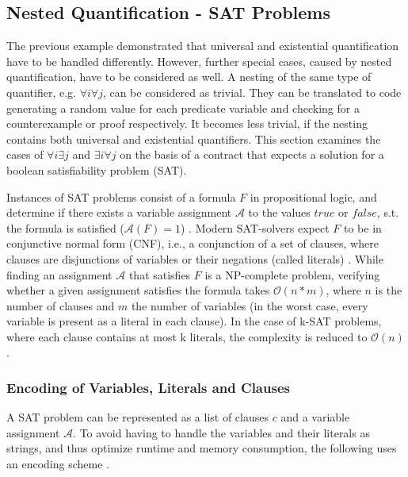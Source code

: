 \subsection{Nested Quantification - SAT Problems}
The previous example demonstrated that universal and existential quantification have to be handled differently. However, further special cases, caused by nested quantification, have to be considered as well. A nesting of the same type of quantifier, e.g. $\forall i \forall j$, can be considered as trivial. They can be translated to code generating a random value for each predicate variable and checking for a counterexample or proof respectively. It becomes less trivial, if the nesting contains both universal and existential quantifiers. This section examines the cases of $\forall i \exists j$ and $\exists i \forall j$ on the basis of a contract that expects a solution for a boolean satisfiability problem (SAT).

Instances of SAT problems consist of a formula $F$ in propositional logic, and determine if there exists a variable assignment $\mathcal{A}$ to the values $true$ or $false$, s.t. the formula is satisfied ($\mathcal{A}(F) = 1$) \cite{Biere2009}. Modern SAT-solvers expect $F$ to be in conjunctive normal form (CNF), i.e., a conjunction of a set of clauses, where clauses are disjunctions of variables or their negations (called literals) \cite{cnf_math_encycl}. While finding an assignment $\mathcal{A}$ that satisfies $F$ is a NP-complete problem, verifying whether a given assignment satisfies the formula takes $\mathcal{O}(n*m)$, where $n$ is the number of clauses and $m$ the number of variables (in the worst case, every variable is present as a literal in each clause). In the case of k-SAT problems, where each clause contains at most k literals, the complexity is reduced to $\mathcal{O}(n)$.

\subsubsection{Encoding of Variables, Literals and Clauses}
A SAT problem can be represented as a list of clauses $c$ and a variable assignment $\mathcal{A}$. To avoid having to handle the variables and their literals as strings, and thus optimize runtime and memory consumption, the following uses an encoding scheme \cite{sabablog}.

